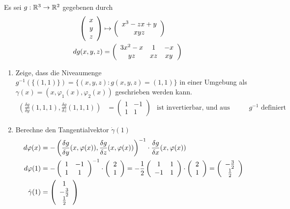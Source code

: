 \documentclass[a4paper]{article}
\begin{document}
		\begin{fmerke}
			Es sei $g: \mathbb{R}^3 \rightarrow \mathbb{R}^2$ gegebenen durch 
			\begin{align*}
				\left( \begin{array}{c} x\\ y \\ z \end{array} \right) &\mapsto \left( \begin{array}{c} x^3 - zx +y \\ xyz \end{array} \right)\\
				dg(x,y,z) &= \left( \begin{array}{ccc}
				                    	3x^2 -x & 1 & -x\\
				                    	yz & xz & xy
				                    \end{array}\right)
			\end{align*}
			\begin{enumerate}
				\item Zeige, dass die Niveaumenge $g^{-1}(\{(1,1)\}) = \{(x,y,z): g(x,y,z) = (1,1)\}$ in einer Umgebung als $\gamma(x)=(x,\varphi_1(x),\varphi_2(x))$ geschrieben werden kann.
				\begin{align*}
					\left( \frac{\delta g}{\delta y}(1,1,1), \frac{\delta g}{\delta z}(1,1,1) \right) &= 
					\left(\begin{array}{cc}
					      	1 & -1\\
					      	1 & 1
					      \end{array}\right) &\text{ist invertierbar, und aus diesem Grund ist $g^{-1}$ definiert}
				\end{align*}
				\item Berechne den Tangentialvektor $\dot\gamma(1)$
					\begin{align*}
						d \varphi(x) &= - \left( \frac{\delta g}{\delta y}(x,\varphi(x)), \frac{\delta g}{\delta z}(x,\varphi(x)) \right)^{-1} \cdot \frac{\delta g}{\delta x}(x, \varphi(x))\\
						d \varphi(1) &= -\left(\begin{array}{cc}
					      	1 & -1\\
					      	1 & 1
					      \end{array}\right)^{-1} \cdot \left( \begin{array}{c} 2 \\ 1 \end{array} \right) = - \frac{1}{2} \left(\begin{array}{cc}
					      	1 & 1\\
					      	-1 & 1
					      \end{array}\right) \cdot \left( \begin{array}{c} 2 \\ 1 \end{array} \right) = \left( \begin{array}{c} - \frac{3}{2}\\ \frac{1}{2} \end{array} \right)\\
					      \dot \gamma(1) &= \left( \begin{array}{c} 1 \\ - \frac{3}{2}\\ \frac{1}{2} \end{array} \right)
					\end{align*}
			\end{enumerate}
		\end{fmerke}
\end{document}
